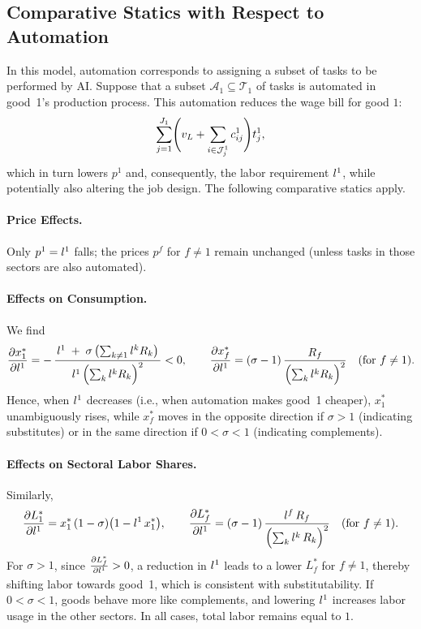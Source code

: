 \documentclass{article}
\theoremstyle{plain}
\theoremstyle{plain}
\begin{document}
\subsection{Comparative Statics with Respect to Automation}

In this model, automation corresponds to assigning a subset of tasks to be performed by AI.  
Suppose that a subset $\mathcal{A}_1 \subseteq \mathcal{T}_1$ of tasks is automated in good~1’s production process.  
This automation reduces the wage bill for good $1$:
\[
\sum_{j=1}^{J_1} \Biggl( v_L + \sum_{i \in \mathcal{J}_j^1} c_{ij}^{1} \Biggr) t_{j}^1,
\]
which in turn lowers $p^1$ and, consequently, the labor requirement $l_{}^1$, while potentially also altering the job design.  
The following comparative statics apply.

\paragraph{Price Effects.}
Only $p^1 = l_{}^1$ falls; the prices $p^f$ for $f\neq 1$ remain unchanged (unless tasks in those sectors are also automated).

\paragraph{Effects on Consumption.}
We find
\[
\frac{\partial x_{1}^*}{\partial l_{}^1}
=
-\,
\frac{\,l_{}^1 \;+\;\sigma\,\bigl(\sum_{k\neq 1}l_{}^kR_{k}\bigr)\,}{
       l_{}^1\,\Bigl(\sum_{k}l_{}^kR_{k}\Bigr)^{2}}
<0,
\qquad
\frac{\partial x_{f}^*}{\partial l_{}^1}
=
(\sigma-1)
\,\frac{\,R_{f}\,}{\Bigl(\sum_{k}l_{}^kR_{k}\Bigr)^{2}}
\quad (\text{for } f\neq 1).
\]
Hence, when $l_{}^1$ decreases (i.e., when automation makes good~1 cheaper), $x_{1}^*$ unambiguously rises, while $x_{f}^*$ moves in the opposite direction if $\sigma>1$ (indicating substitutes) or in the same direction if $0<\sigma<1$ (indicating complements).

\paragraph{Effects on Sectoral Labor Shares.}
Similarly, 
\[
\frac{\partial L_{1}^*}{\partial l_{}^1}
=
x_{1}^*\,(1-\sigma)\bigl(1 - l_{}^1\,x_{1}^*\bigr),
\qquad
\frac{\partial L_{f}^*}{\partial l_{}^1}
=
(\sigma-1)\,
\frac{\,l_{}^f\, R_{f}\,}{\Bigl(\sum_{k} l_{}^k\, R_{k}\Bigr)^{2}}
\quad (\text{for } f\neq 1).
\]
For $\sigma>1$, since $\frac{\partial L_{f}^*}{\partial l_{}^1}>0$, a reduction in $l_{}^1$ leads to a lower $L_f^*$ for $f\neq 1$, thereby shifting labor towards good~1, which is consistent with substitutability.  
If $0<\sigma<1$, goods behave more like complements, and lowering $l_{}^1$ increases labor usage in the other sectors.  
In all cases, total labor remains equal to $1$.
\end{document}
